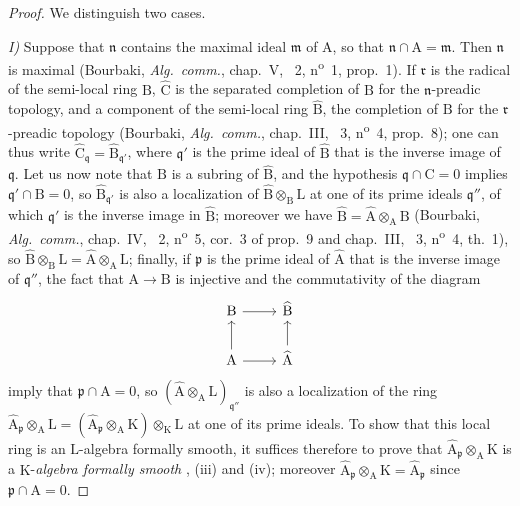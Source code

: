 \begin{proof}
We distinguish two cases.

\emph{I)} Suppose that $\mathfrak{n}$ contains the maximal ideal $\mathfrak{m}$ of $\mathrm{A}$, so that $\mathfrak{n}\cap\mathrm{A}=\mathfrak{m}$.
Then $\mathfrak{n}$ is maximal (Bourbaki, \emph{Alg.~comm.}, chap.~V, \textsection~2, n\textsuperscript{o}~1, prop.~1).
If $\mathfrak{r}$ is the radical of the semi-local ring $\mathrm{B}$, $\widehat{\mathrm{C}}$ is the separated completion of $\mathrm{B}$ for the $\mathfrak{n}$-preadic topology, and a component of the semi-local ring $\widehat{\mathrm{B}}$, the completion of $\mathrm{B}$ for the $\mathfrak{r}$-preadic topology (Bourbaki, \emph{Alg.~comm.}, chap.~III, \textsection~3, n\textsuperscript{o}~4, prop.~8);
one can thus write $\widehat{\mathrm{C}}_\mathfrak{q}=\widehat{\mathrm{B}}_{\mathfrak{q}'}$, where $\mathfrak{q}'$ is the prime ideal of $\widehat{\mathrm{B}}$ that is the inverse image of $\mathfrak{q}$.
Let us now note that $\mathrm{B}$ is a subring of $\widehat{\mathrm{B}}$, and the hypothesis $\mathfrak{q}\cap\mathrm{C}=0$ implies $\mathfrak{q}'\cap\mathrm{B}=0$, so $\widehat{\mathrm{B}}_{\mathfrak{q}'}$ is also a localization of $\widehat{\mathrm{B}}\otimes_\mathrm{B}\mathrm{L}$ at one of its prime ideals $\mathfrak{q}''$, of which $\mathfrak{q}'$ is the inverse image in $\widehat{\mathrm{B}}$;
moreover we have $\widehat{\mathrm{B}}=\widehat{\mathrm{A}}\otimes_\mathrm{A}\mathrm{B}$ (Bourbaki, \emph{Alg.~comm.}, chap.~IV, \textsection~2, n\textsuperscript{o}~5, cor.~3 of prop.~9 and chap.~III, \textsection~3, n\textsuperscript{o}~4, th.~1), so $\widehat{\mathrm{B}}\otimes_\mathrm{B}\mathrm{L}=\widehat{\mathrm{A}}\otimes_\mathrm{A}\mathrm{L}$; finally, if $\mathfrak{p}$ is the prime ideal of $\widehat{\mathrm{A}}$ that is the inverse image of $\mathfrak{q}''$, the fact that $\mathrm{A}\to\mathrm{B}$ is injective and the commutativity of the diagram
\[
  \begin{tikzcd}
    \mathrm{B} \ar[r] & \widehat{\mathrm{B}}\\
    \mathrm{A} \ar[u] \ar[r] & \widehat{\mathrm{A}} \ar[u]
  \end{tikzcd}
\]
imply that $\mathfrak{p}\cap\mathrm{A}=0$, so $(\widehat{\mathrm{A}}\otimes_\mathrm{A}\mathrm{L})_{\mathfrak{q}''}$ is also a localization of the ring $\widehat{\mathrm{A}}_\mathfrak{p}\otimes_\mathrm{A}\mathrm{L}=(\widehat{\mathrm{A}}_\mathfrak{p}\otimes_\mathrm{A}\mathrm{K})\otimes_\mathrm{K}\mathrm{L}$
at one of its prime ideals.
To show that this local ring is an $\mathrm{L}$-algebra formally smooth, it suffices therefore to prove that $\widehat{\mathrm{A}}_\mathfrak{p}\otimes_\mathrm{A}\mathrm{K}$ is a $\mathrm{K}$-\emph{algebra formally smooth} , (iii) and (iv); moreover $\widehat{\mathrm{A}}_\mathfrak{p}\otimes_\mathrm{A}\mathrm{K}=\widehat{\mathrm{A}}_\mathfrak{p}$ since $\mathfrak{p}\cap\mathrm{A}=0$.

\end{proof}
